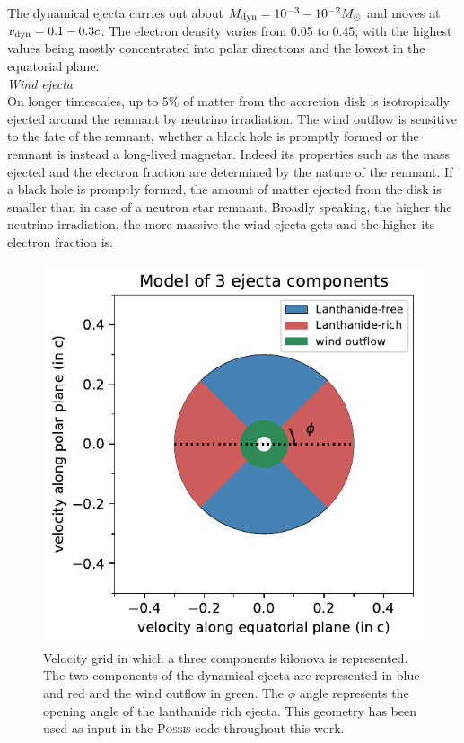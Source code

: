 \documentclass[a4paper, twoside, 11pt]{article}
\numberwithin{equation}{section}
\begin{document}
The dynamical ejecta carries out about $M_{\rm{dyn}} = 10^{-3}-10^{-2} M_{\odot}$ and moves at $v_{\rm{dyn}} = 0.1-0.3 c $. The electron density varies from 0.05 to 0.45, with the highest values being mostly concentrated into polar directions and the lowest in the equatorial plane. \\

\textit{Wind ejecta}\\

On longer timescales, up to $5 \%$ of matter from the accretion disk is isotropically ejected  around the remnant by neutrino irradiation. The wind outflow is sensitive to the fate of the remnant, whether a black hole is promptly formed or the remnant is instead a long-lived magnetar. Indeed its properties such as the mass ejected and the electron fraction are determined by the nature of the remnant. If a black hole is promptly formed, the amount of matter ejected from the disk is smaller than in case of a neutron star remnant. Broadly speaking, the higher the neutrino irradiation, the more massive the wind ejecta gets and the higher its electron fraction is. \\
\begin{figure}[h!]
\centering
\includegraphics[width=0.45\paperwidth]{pictures/model_ejecta_3_2.pdf}
\caption[Geometry of kilonova]{Velocity grid in which a three components kilonova is represented. The two components of the dynamical ejecta are represented in blue and red and the wind outflow in green. The $\phi$ angle represents the opening angle of the lanthanide rich ejecta. This geometry has been used as input in the P\textsc{ossis} code throughout this work.}
\label{fig:geometry}
\end{figure}
\end{document}
